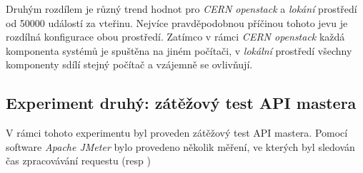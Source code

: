 Druhým rozdílem je různý trend hodnot pro \textit{CERN openstack} a \textit{lokání} prostředí od 50000 událostí za vteřinu. Nejvíce pravděpodobnou příčinou tohoto jevu je rozdílná konfigurace obou prostředí. Zatímco v rámci \textit{CERN openstack} každá komponenta systémů je spuštěna na jiném počítači, v \textit{lokální} prostředí všechny komponenty sdílí stejný počítač a vzájemně se ovlivňují.

\subsection{Experiment druhý: zátěžový test API mastera}
V rámci tohoto experimentu byl proveden zátěžový test API mastera. Pomocí software \textit{Apache JMeter} bylo provedeno několik měření, ve kterých byl sledován čas zpracovávání requestu (resp )

